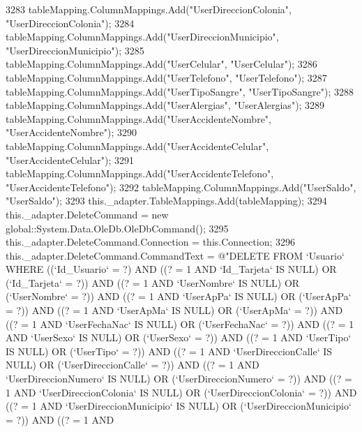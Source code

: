 \begin{DoxyCode}
3283             tableMapping.ColumnMappings.Add(\textcolor{stringliteral}{"UserDireccionColonia"}, \textcolor{stringliteral}{"UserDireccionColonia"});
3284             tableMapping.ColumnMappings.Add(\textcolor{stringliteral}{"UserDireccionMunicipio"}, \textcolor{stringliteral}{"UserDireccionMunicipio"});
3285             tableMapping.ColumnMappings.Add(\textcolor{stringliteral}{"UserCelular"}, \textcolor{stringliteral}{"UserCelular"});
3286             tableMapping.ColumnMappings.Add(\textcolor{stringliteral}{"UserTelefono"}, \textcolor{stringliteral}{"UserTelefono"});
3287             tableMapping.ColumnMappings.Add(\textcolor{stringliteral}{"UserTipoSangre"}, \textcolor{stringliteral}{"UserTipoSangre"});
3288             tableMapping.ColumnMappings.Add(\textcolor{stringliteral}{"UserAlergias"}, \textcolor{stringliteral}{"UserAlergias"});
3289             tableMapping.ColumnMappings.Add(\textcolor{stringliteral}{"UserAccidenteNombre"}, \textcolor{stringliteral}{"UserAccidenteNombre"});
3290             tableMapping.ColumnMappings.Add(\textcolor{stringliteral}{"UserAccidenteCelular"}, \textcolor{stringliteral}{"UserAccidenteCelular"});
3291             tableMapping.ColumnMappings.Add(\textcolor{stringliteral}{"UserAccidenteTelefono"}, \textcolor{stringliteral}{"UserAccidenteTelefono"});
3292             tableMapping.ColumnMappings.Add(\textcolor{stringliteral}{"UserSaldo"}, \textcolor{stringliteral}{"UserSaldo"});
3293             this.\_adapter.TableMappings.Add(tableMapping);
3294             this.\_adapter.DeleteCommand = \textcolor{keyword}{new} global::System.Data.OleDb.OleDbCommand();
3295             this.\_adapter.DeleteCommand.Connection = this.Connection;
3296             this.\_adapter.DeleteCommand.CommandText = \textcolor{stringliteral}{@"DELETE FROM `Usuario` WHERE ((`Id\_Usuario` = ?) AND
       ((? = 1 AND `Id\_Tarjeta` IS NULL) OR (`Id\_Tarjeta` = ?)) AND ((? = 1 AND `UserNombre` IS NULL) OR
       (`UserNombre` = ?)) AND ((? = 1 AND `UserApPa` IS NULL) OR (`UserApPa` = ?)) AND ((? = 1 AND `UserApMa` IS NULL) OR
       (`UserApMa` = ?)) AND ((? = 1 AND `UserFechaNac` IS NULL) OR (`UserFechaNac` = ?)) AND ((? = 1 AND `UserSexo`
       IS NULL) OR (`UserSexo` = ?)) AND ((? = 1 AND `UserTipo` IS NULL) OR (`UserTipo` = ?)) AND ((? = 1 AND
       `UserDireccionCalle` IS NULL) OR (`UserDireccionCalle` = ?)) AND ((? = 1 AND `UserDireccionNumero` IS NULL) OR
       (`UserDireccionNumero` = ?)) AND ((? = 1 AND `UserDireccionColonia` IS NULL) OR (`UserDireccionColonia` = ?))
       AND ((? = 1 AND `UserDireccionMunicipio` IS NULL) OR (`UserDireccionMunicipio` = ?)) AND ((? = 1 AND
}
\end{DoxyCode}
